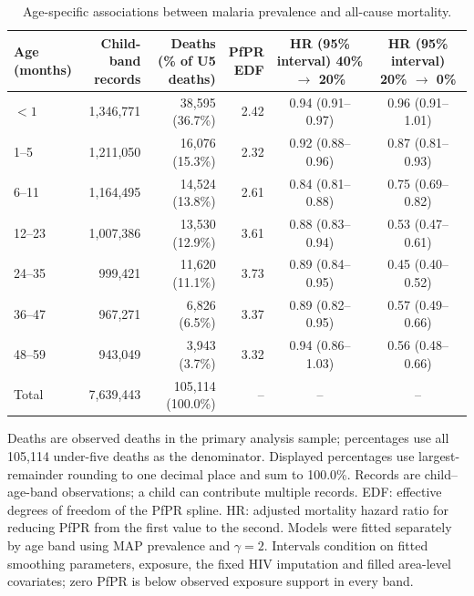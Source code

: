 \documentclass[12pt]{article}
\begin{document}
\begin{table}[tbp]
\centering
\caption{Age-specific associations between malaria prevalence and all-cause mortality.}
\label{tab:primary-age-band-effects}
\small
\setlength{\tabcolsep}{3pt}
\renewcommand{\arraystretch}{1.15}
\begin{tabular*}{\linewidth}{@{\extracolsep{\fill}}lrrrcc@{}}
\toprule
\shortstack[l]{Age\\(months)} & \shortstack{Child-band\\records} & \shortstack{Deaths\\(\% of U5 deaths)} & \shortstack{PfPR\\EDF} & \shortstack{HR (95\% interval)\\40\% $\to$ 20\%} & \shortstack{HR (95\% interval)\\20\% $\to$ 0\%} \\
\midrule
$<1$ & 1,346,771 & 38,595 (36.7\%) & 2.42 & 0.94 (0.91--0.97) & 0.96 (0.91--1.01) \\
1--5 & 1,211,050 & 16,076 (15.3\%) & 2.32 & 0.92 (0.88--0.96) & 0.87 (0.81--0.93) \\
6--11 & 1,164,495 & 14,524 (13.8\%) & 2.61 & 0.84 (0.81--0.88) & 0.75 (0.69--0.82) \\
12--23 & 1,007,386 & 13,530 (12.9\%) & 3.61 & 0.88 (0.83--0.94) & 0.53 (0.47--0.61) \\
24--35 & 999,421 & 11,620 (11.1\%) & 3.73 & 0.89 (0.84--0.95) & 0.45 (0.40--0.52) \\
36--47 & 967,271 & 6,826 (6.5\%) & 3.37 & 0.89 (0.82--0.95) & 0.57 (0.49--0.66) \\
48--59 & 943,049 & 3,943 (3.7\%) & 3.32 & 0.94 (0.86--1.03) & 0.56 (0.48--0.66) \\
\midrule
Total & 7,639,443 & 105,114 (100.0\%) & -- & -- & -- \\
\bottomrule
\end{tabular*}
\par\vspace{0.5em}
\begin{minipage}{\linewidth}
\footnotesize
Deaths are observed deaths in the primary analysis sample; percentages use all 105,114 under-five deaths as the denominator.
Displayed percentages use largest-remainder rounding to one decimal place and sum to 100.0\%.
Records are child--age-band observations; a child can contribute multiple records.
EDF: effective degrees of freedom of the PfPR spline. HR: adjusted mortality hazard ratio for reducing PfPR from the first value to the second.
Models were fitted separately by age band using MAP prevalence and $\gamma=2$.
Intervals condition on fitted smoothing parameters, exposure, the fixed HIV imputation and filled area-level covariates; zero PfPR is below observed exposure support in every band.
\end{minipage}
\end{table}
\end{document}
